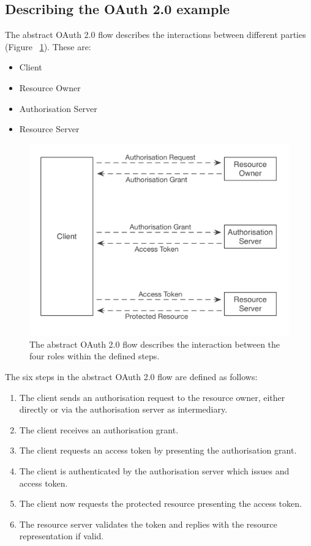 \subsection{Describing the OAuth 2.0 example}

The abstract OAuth 2.0 flow describes the interactions between different parties (Figure ~\ref{fig:oauth2flow}). These are:

\begin{itemize}
    \item Client
    \item Resource Owner
    \item Authorisation Server
    \item Resource Server
\end{itemize}

\begin{figure}
\includegraphics[width=\textwidth]{figures/OAuth2Flow.png}
\caption[OAuth 2.0 Flow.]{The abstract OAuth 2.0 flow describes the interaction between the four roles within the defined steps.
\label{fig:oauth2flow}}
\end{figure}

The six steps in the abstract OAuth 2.0 flow are defined as follows:
\begin{enumerate}
    \item The client sends an authorisation request to the resource owner, either directly or via the authorisation server as intermediary.
    \item The client receives an authorisation grant.
    \item The client requests an access token by presenting the authorisation grant.
    \item The client is authenticated by the authorisation server which issues and access token.
    \item The client now requests the protected resource presenting the access token.
    \item The resource server validates the token and replies with the resource representation if valid.
\end{enumerate}

